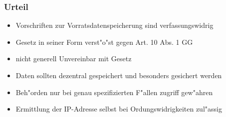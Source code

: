   \begin{frame}
    \frametitle{Urteil}
    \begin{itemize}
      \item Vorschriften zur Vorratsdatenspeicherung sind verfassungswidrig
      \item Gesetz in seiner Form verst"o"st gegen Art. 10 Abs. 1 GG
      \item nicht generell Unvereinbar mit Gesetz
      \item Daten sollten dezentral gespeichert und besonders gesichert werden
      \item Beh"orden nur bei genau spezifizierten F"allen zugriff gew"ahren
      \item Ermittlung der IP-Adresse selbst bei Ordungswidrigkeiten zul"assig
    \end{itemize}
  \end{frame}
